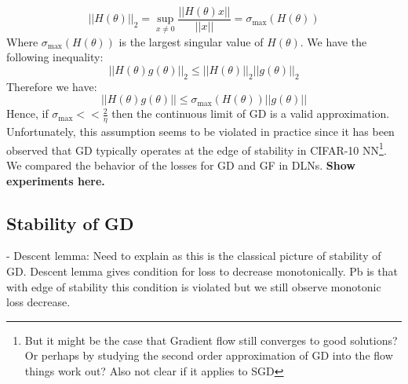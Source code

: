 \documentclass[11pt]{article}
\begin{document}
\begin{equation}
||H(\theta)||_2 = \sup_{x \neq 0} \frac{||H(\theta)x||}{||x||} = \sigma_{\max}(H(\theta))
\end{equation}
Where $\sigma_{\max}(H(\theta))$ is the largest singular value of $H(\theta)$.
We have the following inequality:
\begin{equation}
||H(\theta)g(\theta)||_2 \leq ||H(\theta)||_2 ||g(\theta)||_2
\end{equation}
Therefore we have:
\begin{equation}
||H(\theta)g(\theta)|| \leq \sigma_{\max}(H(\theta)) ||g(\theta)||
\end{equation}
Hence, if $\sigma_{\max} << \frac{2}{\eta}$ then the continuous limit of GD is a valid approximation. Unfortunately, this assumption seems to be violated in practice since it has been observed that GD typically operates at the edge of stability in CIFAR-10 NN\footnote{But it might be the case that Gradient flow still converges to good solutions? Or perhaps by studying the second order approximation of GD into the flow things work out? Also not clear if it applies to SGD}. We compared the behavior of the losses for GD and GF in DLNs. \textbf{Show experiments here.}
\subsection*{Stability of GD}
- Descent lemma:
Need to explain as this is the classical picture of stability of GD. Descent lemma gives condition for loss to decrease monotonically. Pb is that with edge of stability this condition is violated but we still observe monotonic loss decrease.
\end{document}
